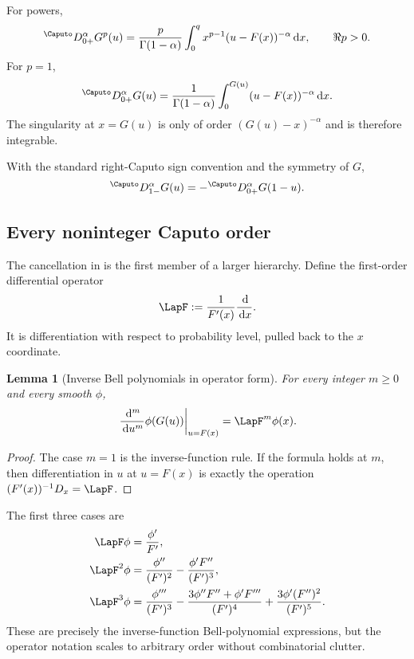 \documentclass[11pt,oneside]{article}
\newtheorem{lemma}[theorem]{Lemma}
\theoremstyle{definition}
\theoremstyle{remark}
\newcommand{\dd}{\,\mathrm d}
\newcommand{\1}{\mathbf 1}
\begin{document}
For powers,
\begin{equation}
 {}^{\Caputo}D_{0+}^{\alpha}G^p(u)
 =\frac{p}{\Gamma(1-\alpha)}
  \int_0^{q}x^{p-1}(u-F(x))^{-\alpha}\dd x,
 \qquad \Re p>0.
 \label{p11:eq:caputo-powers}
\end{equation}
For $p=1$,
\begin{equation}
 {}^{\Caputo}D_{0+}^{\alpha}G(u)
 =\frac1{\Gamma(1-\alpha)}
  \int_0^{G(u)}(u-F(x))^{-\alpha}\dd x.
 \label{p11:eq:caputo-G}
\end{equation}
The singularity at $x=G(u)$ is only of order $(G(u)-x)^{-\alpha}$ and is
therefore integrable.

With the standard right-Caputo sign convention and the symmetry of $G$,
\begin{equation}
 {}^{\Caputo}D_{1-}^{\alpha}G(u)
 =-{}^{\Caputo}D_{0+}^{\alpha}G(1-u).
 \label{p11:eq:right-left-caputo-symmetry}
\end{equation}

\subsection{Every noninteger Caputo order}

The cancellation in  is the first member of a
larger hierarchy.  Define the first-order differential operator
\begin{equation}
 \LapF:=\frac1{F'(x)}\frac{\dd}{\dd x}.
 \label{p11:eq:L-F-def}
\end{equation}
It is differentiation with respect to probability level, pulled back to the
$x$ coordinate.

\begin{lemma}[Inverse Bell polynomials in operator form]
For every integer $m\ge0$ and every smooth $\phi$,
\begin{equation}
 \left.\frac{\dd^m}{\dd u^m}\phi(G(u))\right|_{u=F(x)}
 =\LapF^m\phi(x).
 \label{p11:eq:L-F-chain}
\end{equation}
\end{lemma}

\begin{proof}
The case $m=1$ is the inverse-function rule.  If the formula holds at $m$,
then differentiation in $u$ at $u=F(x)$ is exactly the operation
$(F'(x))^{-1}D_x=\LapF$.
\end{proof}

The first three cases are
\begin{align}
 \LapF\phi
 &=\frac{\phi'}{F'},\\
 \LapF^2\phi
 &=\frac{\phi''}{(F')^2}-\frac{\phi'F''}{(F')^3},\\
 \LapF^3\phi
 &=\frac{\phi'''}{(F')^3}
 -\frac{3\phi''F''+\phi'F'''}{(F')^4}
 +\frac{3\phi'(F'')^2}{(F')^5}.
 \label{p11:eq:first-LF-powers}
\end{align}
These are precisely the inverse-function Bell-polynomial expressions, but the
operator notation scales to arbitrary order without combinatorial clutter.
\end{document}
